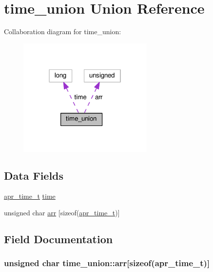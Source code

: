 \hypertarget{uniontime__union}{}\section{time\+\_\+union Union Reference}
\label{uniontime__union}


Collaboration diagram for time\+\_\+union\+:
\nopagebreak
\begin{figure}[H]
\begin{center}
\leavevmode
\includegraphics[width=190pt]{uniontime__union__coll__graph}
\end{center}
\end{figure}
\subsection*{Data Fields}
\begin{DoxyCompactItemize}
\item 
\hyperlink{group__apr__time_gadb4bde16055748190eae190c55aa02bb}{apr\+\_\+time\+\_\+t} \hyperlink{uniontime__union_a9a5b1768f65ab2e0a646fe71066a5329}{time}
\item 
unsigned char \hyperlink{uniontime__union_a824be441c131cb161d24d945410e36f8}{arr} \mbox{[}sizeof(\hyperlink{group__apr__time_gadb4bde16055748190eae190c55aa02bb}{apr\+\_\+time\+\_\+t})\mbox{]}
\end{DoxyCompactItemize}


\subsection{Field Documentation}
\subsubsection[{\texorpdfstring{arr}{arr}}]{\setlength{\rightskip}{0pt plus 5cm}unsigned char time\+\_\+union\+::arr\mbox{[}sizeof({\bf apr\+\_\+time\+\_\+t})\mbox{]}}\hypertarget{uniontime__union_a824be441c131cb161d24d945410e36f8}{}\label{uniontime__union_a824be441c131cb161d24d945410e36f8}
